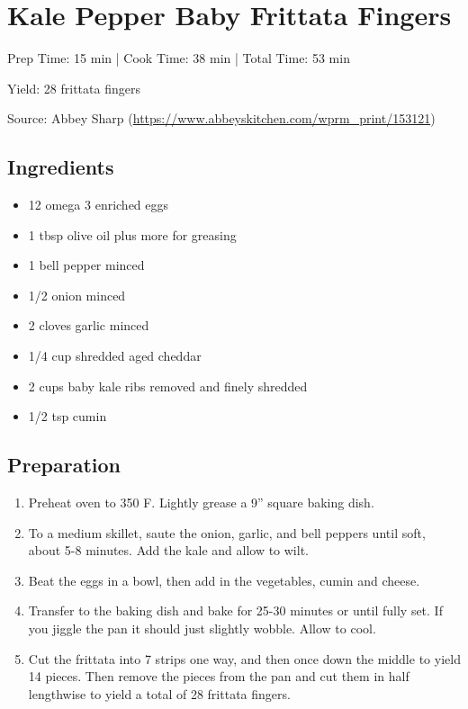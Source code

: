\section{Kale Pepper Baby Frittata Fingers}

\begin{center}
Prep Time: 15 min |
Cook Time: 38 min |
Total Time: 53 min

\noindent Yield: 28 frittata fingers

\vspace{1em}

    Source: Abbey Sharp (\url{https://www.abbeyskitchen.com/wprm_print/153121})
\end{center}

\subsection{Ingredients}
\begin{multicols}{2}
\begin{itemize}
    \item 12 omega 3 enriched eggs
    \item 1 tbsp olive oil plus more for greasing
    \item 1 bell pepper minced
    \item 1/2 onion minced
    \item 2 cloves garlic minced
    \item 1/4 cup shredded aged cheddar
    \item 2 cups baby kale ribs removed and finely shredded
    \item 1/2 tsp cumin
\end{itemize}
\end{multicols}

\subsection{Preparation}
\begin{enumerate}
    \item Preheat oven to 350 F. Lightly grease a 9'' square baking dish.
    \item To a medium skillet, saute the onion, garlic, and bell peppers until soft, about 5-8 minutes. Add the kale and allow to wilt.
    \item Beat the eggs in a bowl, then add in the vegetables, cumin and cheese.
    \item Transfer to the baking dish and bake for 25-30 minutes or until fully set. If you jiggle the pan it should just slightly wobble. Allow to cool.
    \item Cut the frittata into 7 strips one way, and then once down the middle to yield 14 pieces. Then remove the pieces from the pan and cut them in half lengthwise to yield a total of 28 frittata fingers.
\end{enumerate}

